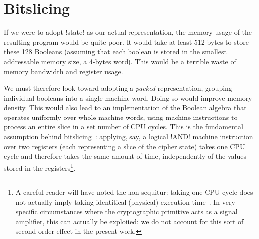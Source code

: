 \documentclass[draft,english]{jflart}
\newcommand{\Skinny}{\textsc{Skinny}}
\newcommand{\Gift}{\textsc{Gift}}
\begin{document}
\section{Bitslicing}
\label{sec:bitslicing}


If we were to adopt \coqe!state! as our actual representation, the
memory usage of the resulting program would be quite poor. It would
take at least 512 bytes to store these 128 Booleans (assuming that each
boolean is stored in the smallest addressable memory size, a 4-bytes
word). This would be a terrible waste of memory bandwidth and register
usage.


We must therefore look toward adopting a \emph{packed} representation,
grouping individual booleans into a single machine word. Doing so
would improve memory density. This would also lead to an
implementation of the Boolean algebra that operates uniformly over
whole machine words, using machine instructions to process an entire
slice in a set number of CPU cycles. This is the fundamental
assumption behind bitslicing~\citep{biham:DES}: applying, say, a
logical \coqe!AND! machine instruction over two registers (each
representing a slice of the cipher state) takes one CPU cycle and
therefore takes the same amount of time, independently of the values
stored in the registers\footnote{A careful reader will have noted the
non sequitur: taking one CPU cycle does not actually imply
taking identitical (physical) execution time~\citep{wang:hertzbleed}. In very specific circumstances where the cryptographic primitive acts as a signal amplifier, this can actually be exploited: we do not account for this sort of second-order effect in the present work.}.

\end{document}
